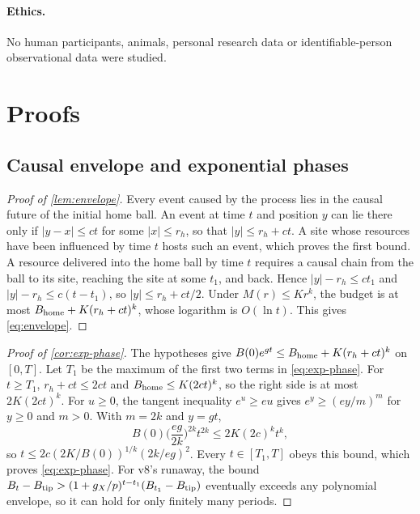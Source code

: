 \documentclass[11pt,a4paper]{article}
\theoremstyle{definition}
\newcommand{\Btip}{B_{\rm tip}}
\begin{document}
\paragraph{Ethics.}
No human participants, animals, personal research data or identifiable-person
observational data were studied.

\appendix
\section{Proofs}
\label{app:proofs}

\subsection{Causal envelope and exponential phases}
\label{app:envelope-proof}
\begin{proof}[Proof of \cref{lem:envelope}]
Every event caused by the process lies in the causal future of the initial
home ball. An event at time $t$ and position $y$ can lie there only if
$|y-x|\leq ct$ for some $|x|\leq r_h$, so that $|y|\leq r_h+ct$. A site whose
resources have been influenced by time $t$ hosts such an event, which proves
the first bound. A resource delivered into the home ball by time $t$ requires
a causal chain from the ball to its site, reaching the site at some $t_1$, and
back. Hence $|y|-r_h\leq ct_1$ and $|y|-r_h\leq c(t-t_1)$, so
$|y|\leq r_h+ct/2$. Under $M(r)\leq Kr^k$, the budget is at most
$B_{\rm home}+K(r_h+ct)^k$, whose logarithm is $O(\ln t)$. This gives
\cref{eq:envelope}.
\end{proof}

\begin{proof}[Proof of \cref{cor:exp-phase}]
The hypotheses give $B(0)e^{gt}\leq B_{\rm home}+K(r_h+ct)^k$ on $[0,T]$. Let
$T_1$ be the maximum of the first two terms in \cref{eq:exp-phase}. For
$t\geq T_1$, $r_h+ct\leq2ct$ and $B_{\rm home}\leq K(2ct)^k$, so the right side
is at most $2K(2ct)^k$. For $u\geq0$, the tangent inequality $e^u\geq eu$ gives
$e^{y}\geq(ey/m)^m$ for $y\geq0$ and $m>0$. With $m=2k$ and $y=gt$,
\[
 B(0)\Big(\frac{eg}{2k}\Big)^{2k}t^{2k}\leq2K(2c)^kt^k,
\]
so $t\leq2c(2K/B(0))^{1/k}(2k/eg)^2$. Every $t\in[T_1,T]$ obeys this bound,
which proves \cref{eq:exp-phase}. For v8's runaway, the bound
$B_t-\Btip>(1+g_X/p)^{t-t_1}(B_{t_1}-\Btip)$ eventually exceeds any polynomial
envelope, so it can hold for only finitely many periods.
\end{proof}
\end{document}
